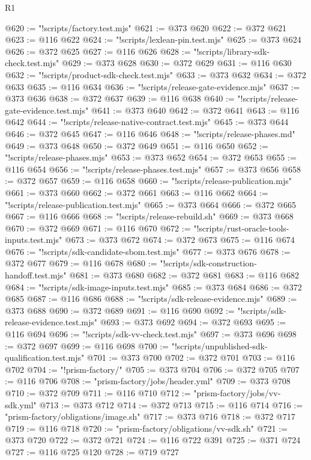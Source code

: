 \begin{lexlean}{R1}
\begin{coremodule}
@620 := "!scripts/factory.test.mjs"
@621 := @373 @620
@622 := @372 @621
@623 := @116 @622
@624 := "!scripts/lexlean-pin.test.mjs"
@625 := @373 @624
@626 := @372 @625
@627 := @116 @626
@628 := "!scripts/library-sdk-check.test.mjs"
@629 := @373 @628
@630 := @372 @629
@631 := @116 @630
@632 := "!scripts/product-sdk-check.test.mjs"
@633 := @373 @632
@634 := @372 @633
@635 := @116 @634
@636 := "!scripts/release-gate-evidence.mjs"
@637 := @373 @636
@638 := @372 @637
@639 := @116 @638
@640 := "!scripts/release-gate-evidence.test.mjs"
@641 := @373 @640
@642 := @372 @641
@643 := @116 @642
@644 := "!scripts/release-native-contract.test.mjs"
@645 := @373 @644
@646 := @372 @645
@647 := @116 @646
@648 := "!scripts/release-phases.md"
@649 := @373 @648
@650 := @372 @649
@651 := @116 @650
@652 := "!scripts/release-phases.mjs"
@653 := @373 @652
@654 := @372 @653
@655 := @116 @654
@656 := "!scripts/release-phases.test.mjs"
@657 := @373 @656
@658 := @372 @657
@659 := @116 @658
@660 := "!scripts/release-publication.mjs"
@661 := @373 @660
@662 := @372 @661
@663 := @116 @662
@664 := "!scripts/release-publication.test.mjs"
@665 := @373 @664
@666 := @372 @665
@667 := @116 @666
@668 := "!scripts/release-rebuild.sh"
@669 := @373 @668
@670 := @372 @669
@671 := @116 @670
@672 := "!scripts/rust-oracle-tools-inputs.test.mjs"
@673 := @373 @672
@674 := @372 @673
@675 := @116 @674
@676 := "!scripts/sdk-candidate-sbom.test.mjs"
@677 := @373 @676
@678 := @372 @677
@679 := @116 @678
@680 := "!scripts/sdk-construction-handoff.test.mjs"
@681 := @373 @680
@682 := @372 @681
@683 := @116 @682
@684 := "!scripts/sdk-image-inputs.test.mjs"
@685 := @373 @684
@686 := @372 @685
@687 := @116 @686
@688 := "!scripts/sdk-release-evidence.mjs"
@689 := @373 @688
@690 := @372 @689
@691 := @116 @690
@692 := "!scripts/sdk-release-evidence.test.mjs"
@693 := @373 @692
@694 := @372 @693
@695 := @116 @694
@696 := "!scripts/sdk-vv-check.test.mjs"
@697 := @373 @696
@698 := @372 @697
@699 := @116 @698
@700 := "!scripts/unpublished-sdk-qualification.test.mjs"
@701 := @373 @700
@702 := @372 @701
@703 := @116 @702
@704 := "!prism-factory/"
@705 := @373 @704
@706 := @372 @705
@707 := @116 @706
@708 := "prism-factory/jobs/header.yml"
@709 := @373 @708
@710 := @372 @709
@711 := @116 @710
@712 := "prism-factory/jobs/vv-sdk.yml"
@713 := @373 @712
@714 := @372 @713
@715 := @116 @714
@716 := "prism-factory/obligations/image.sh"
@717 := @373 @716
@718 := @372 @717
@719 := @116 @718
@720 := "prism-factory/obligations/vv-sdk.sh"
@721 := @373 @720
@722 := @372 @721
@724 := @116 @722 @391
@725 := @371 @724
@727 := @116 @725 @120
@728 := @719 @727

\end{coremodule}
\end{lexlean}
